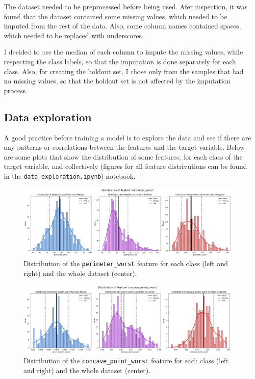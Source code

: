 \documentclass[12pt]{article}
\begin{document}
The dataset needed to be preprocessed before being used. Afer inspection, it was
found that the dataset contained some missing values, which needed to be
imputed from the rest of the data. Also, some column names contained spaces,
which needed to be replaced with underscores.

I decided to use the median of each column to impute the missing values, while
respecting the class labels, so that the imputation is done separately for each
class. Also, for creating the holdout set, I chose only from the samples that
had no missing values, so that the holdout set is not affected by the imputation
process.


\subsection{Data exploration}

A good practice before training a model is to explore the data and see if there
are any patterns or correlations between the features and the target variable.
Below are some plots that show the distribution of some features, for each class
of the target variable, and collectively (figures for all feature distrivutions
can be found in the \texttt{data\_exploration.ipynb}) notebook.

\begin{figure}[H]
    \centering
    \includegraphics[width=\textwidth]{ims/perimeter_worst.png}
    \caption{Distribution of the \texttt{perimeter\_worst} feature for each
    class (left and right) and the whole dataset (center).}
    \label{fig:perimeter_worst}
\end{figure}

\begin{figure}[H]
    \centering
    \includegraphics[width=\textwidth]{ims/concave_points_worst.png}
    \caption{Distribution of the \texttt{concave\_point\_worst} feature for each
    class (left and right) and the whole dataset (center).}
    \label{fig:area_worst}
\end{figure}
\end{document}
